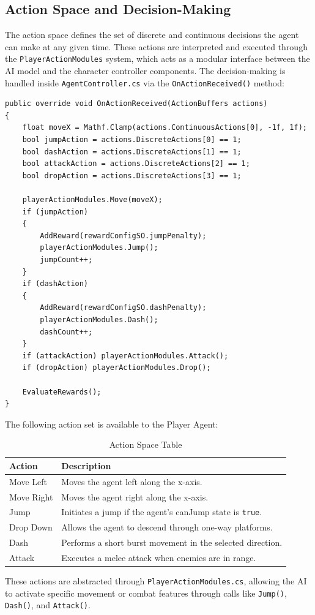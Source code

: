 \documentclass[12pt,oneside,openright,a4paper]{cpe-english-project}
\begin{document}
\subsection{Action Space and Decision-Making}
The action space defines the set of discrete and continuous decisions the agent can make at any given time. These actions are interpreted and executed through the \texttt{PlayerActionModules} system, which acts as a modular interface between the AI model and the character controller components.
The decision-making is handled inside \texttt{AgentController.cs} via the \texttt{OnActionReceived()} method:
\begin{lstlisting}[language={[Sharp]C}]
public override void OnActionReceived(ActionBuffers actions)
{
	float moveX = Mathf.Clamp(actions.ContinuousActions[0], -1f, 1f);
	bool jumpAction = actions.DiscreteActions[0] == 1;
	bool dashAction = actions.DiscreteActions[1] == 1;
	bool attackAction = actions.DiscreteActions[2] == 1;
	bool dropAction = actions.DiscreteActions[3] == 1;

	playerActionModules.Move(moveX);
	if (jumpAction)
	{
		AddReward(rewardConfigSO.jumpPenalty);
		playerActionModules.Jump();
		jumpCount++;
	}
	if (dashAction)
	{
		AddReward(rewardConfigSO.dashPenalty);
		playerActionModules.Dash();
		dashCount++;
	}
	if (attackAction) playerActionModules.Attack();
	if (dropAction) playerActionModules.Drop();

	EvaluateRewards();
}
\end{lstlisting}
The following action set is available to the Player Agent:
\begin{table}[!h]
\caption{Action Space Table}\label{tbl:Action Space Table}
\begin{tabular}{|l|l|} \hline
\textbf{Action} & \textbf{Description} \\ \hline
Move Left & Moves the agent left along the x-axis. \\ 
Move Right & Moves the agent right along the x-axis. \\ 
Jump & Initiates a jump if the agent's canJump state is \texttt{true}. \\ 
Drop Down & Allows the agent to descend through one-way platforms. \\ 
Dash & Performs a short burst movement in the selected direction. \\ 
Attack & Executes a melee attack when enemies are in range. \\ \hline
\end{tabular}
\end{table}
These actions are abstracted through \texttt{PlayerActionModules.cs}, allowing the AI to activate specific movement or combat features through calls like \texttt{Jump()}, \texttt{Dash()}, and \texttt{Attack()}.
\end{document}

